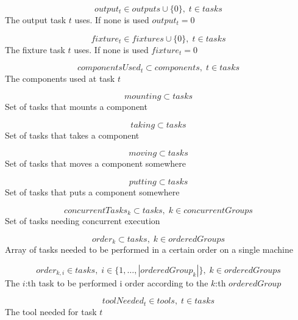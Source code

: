 \documentclass[10pt,a4paper]{report}
\begin{document}
\begin{equation}\label{eq:23}
output_t \in outputs \cup \{0\}, \; t \in tasks\end{equation}
The output task $t$ uses. If none is used $output_t = 0$

\begin{equation}\label{eq:24}
fixture_t \in fixtures \cup \{0\}, \; t \in tasks\end{equation}
The fixture task $t$ uses. If none is used $fixture_t = 0$

\begin{equation}\label{eq:25}
componentsUsed_t \subset components, \; t \in tasks\end{equation}
The components used at task $t$

\begin{equation}\label{eq:26}
mounting \subset tasks\end{equation}
Set of tasks that mounts a component

\begin{equation}\label{eq:27}
taking \subset tasks\end{equation}
Set of tasks that takes a component

\begin{equation}\label{eq:28}
moving \subset tasks\end{equation}
Set of tasks that moves a component somewhere

\begin{equation}\label{eq:29}
putting \subset tasks\end{equation}
Set of tasks that puts a component somewhere

\begin{equation}\label{eq:30}
concurrentTasks_k \subset tasks, \; k \in concurrentGroups\end{equation}
Set of tasks needing concurrent execution

\begin{equation}\label{eq:31}
order_k \subset tasks, \; k \in orderedGroups
\end{equation} 
Array of tasks needed to be performed in a certain order on a single machine

\begin{equation}\label{eq:32}
order_{k,i} \in tasks, \; i \in \{1 , \ldots , |orderedGroup_k|\}, \; k \in orderedGroups
\end{equation}
The $i$:th task to be performed i order according to the $k$:th $orderedGroup$

\begin{equation}\label{eq:33}
toolNeeded_t \in tools, \; t \in tasks\end{equation} 
The tool needed for task $t$
\end{document}

